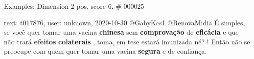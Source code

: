 \begin{frame}{Examples: Dimension 2 pos, score 6, \# 000025}
\footnotesize
\begin{exampleblock}{text: t017876, user: unknown, 2020-10-30}
@GabyKcs1 @RenovaMidia É simples, se você quer tomar uma vacina 
\textbf{chinesa} sem \textbf{comprovação} de \textbf{eficácia} e que não trará 
\textbf{efeitos} \textbf{colaterais} , toma, em tese estará imunizada né? ! 
Então não se preocupe com quem quer tomar uma vacina \textbf{segura} e de 
confiança. 
\end{exampleblock}
\end{frame}
